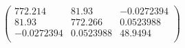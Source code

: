 \documentclass{article}
\begin{document}
\[\left(
\begin{array}{ccc}
 772.214 & 81.93 & -0.0272394 \\
 81.93 & 772.266 & 0.0523988 \\
 -0.0272394 & 0.0523988 & 48.9494 \\
\end{array}
\right)\]
\end{document}
